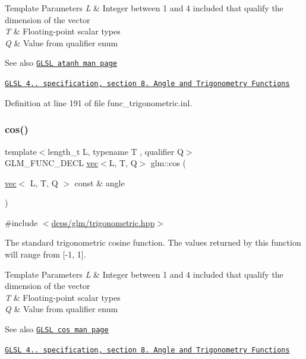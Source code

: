 \begin{DoxyTemplParams}{Template Parameters}
{\em L} & Integer between 1 and 4 included that qualify the dimension of the vector \\
\hline
{\em T} & Floating-\/point scalar types \\
\hline
{\em Q} & Value from qualifier enum\\
\hline
\end{DoxyTemplParams}
\begin{DoxySeeAlso}{See also}
\href{http://www.opengl.org/sdk/docs/manglsl/xhtml/atanh.xml}{\tt G\+L\+SL atanh man page} 

\href{http://www.opengl.org/registry/doc/GLSLangSpec.4.20.8.pdf}{\tt G\+L\+SL 4.. specification, section 8. Angle and Trigonometry Functions} 
\end{DoxySeeAlso}


Definition at line 191 of file func\+\_\+trigonometric.\+inl.

\mbox{\label{group__core__func__trigonometric_ga6a41efc740e3b3c937447d3a6284130e}} 
\subsubsection{\texorpdfstring{cos()}{cos()}}
{\footnotesize\ttfamily template$<$length\+\_\+t L, typename T , qualifier Q$>$ \\
G\+L\+M\+\_\+\+F\+U\+N\+C\+\_\+\+D\+E\+CL \hyperlink{structglm_1_1vec}{vec}$<$L, T, Q$>$ glm\+::cos (\begin{DoxyParamCaption}\item[{\hyperlink{structglm_1_1vec}{vec}$<$ L, T, Q $>$ const \&}]{angle }\end{DoxyParamCaption})}



{\ttfamily \#include $<$\hyperlink{trigonometric_8hpp}{deps/glm/trigonometric.\+hpp}$>$}

The standard trigonometric cosine function. The values returned by this function will range from \mbox{[}-\/1, 1\mbox{]}.


\begin{DoxyTemplParams}{Template Parameters}
{\em L} & Integer between 1 and 4 included that qualify the dimension of the vector \\
\hline
{\em T} & Floating-\/point scalar types \\
\hline
{\em Q} & Value from qualifier enum\\
\hline
\end{DoxyTemplParams}
\begin{DoxySeeAlso}{See also}
\href{http://www.opengl.org/sdk/docs/manglsl/xhtml/cos.xml}{\tt G\+L\+SL cos man page} 

\href{http://www.opengl.org/registry/doc/GLSLangSpec.4.20.8.pdf}{\tt G\+L\+SL 4.. specification, section 8. Angle and Trigonometry Functions} 
\end{DoxySeeAlso}


